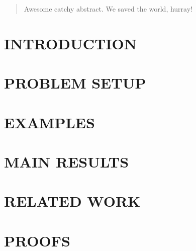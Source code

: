 \documentclass[twoside]{article}
\begin{document}
%

%



\begin{abstract}
	Awesome catchy abstract. We saved the world, hurray!
\end{abstract}

\section{INTRODUCTION}
\label{sec:intro}


\section{PROBLEM SETUP}
\label{sec:problem}


\section{EXAMPLES}
\label{sec:ex}


\section{MAIN RESULTS}
\label{sec:results}


\section{RELATED WORK}
\label{sec:related}


\section{PROOFS}
\label{sec:proofs}



\end{document}
